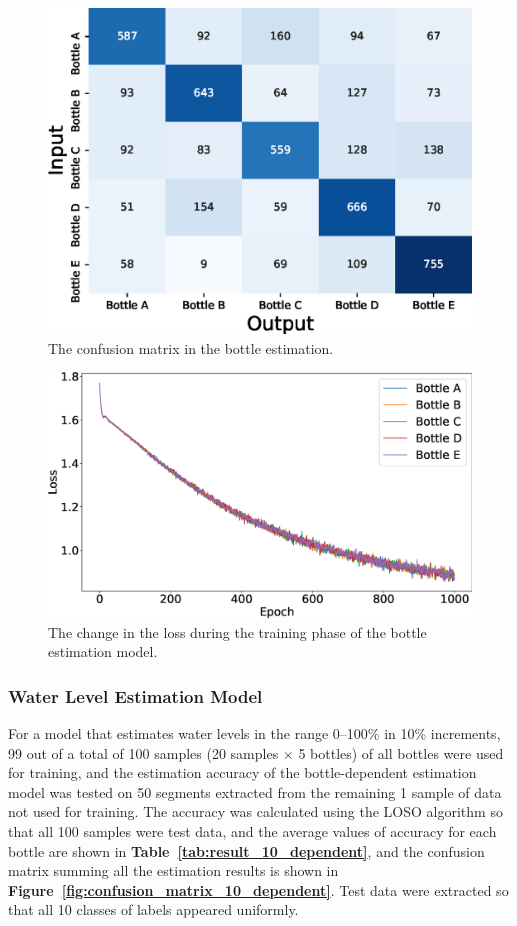 \documentclass[sigconf]{acmart}
\newcommand\figref[1]{\textbf{Figure~\ref{fig:#1}}}
\newcommand\tabref[1]{\textbf{Table~\ref{tab:#1}}}
\begin{document}
\begin{figure}[!t]
  \centering
  \includegraphics[width=1\linewidth]{figures/confusion_matrix_5.eps}
  \caption{The confusion matrix in the bottle estimation.}
  \label{fig:confusion_matrix_5}
\end{figure}

\begin{figure}[!t]
  \centering
  \includegraphics[width=1\linewidth]{figures/loss_5.eps}
  \caption{The change in the loss during the training phase of the bottle estimation model.}
  \label{fig:loss}
\end{figure}

\subsubsection{Water Level Estimation Model}
For a model that estimates water levels in the range 0--100\% in 10\% increments, 99 out of a total of 100 samples (20 samples $\times$ 5 bottles) of all bottles were used for training, and the estimation accuracy of the bottle-dependent estimation model was tested on 50 segments extracted from the remaining 1 sample of data not used for training. The accuracy was calculated using the LOSO algorithm so that all 100 samples were test data, and the average values of accuracy for each bottle are shown in \tabref{result_10_dependent}, and the confusion matrix summing all the estimation results is shown in \figref{confusion_matrix_10_dependent}. Test data were extracted so that all 10 classes of labels appeared uniformly.\par
\end{document}
